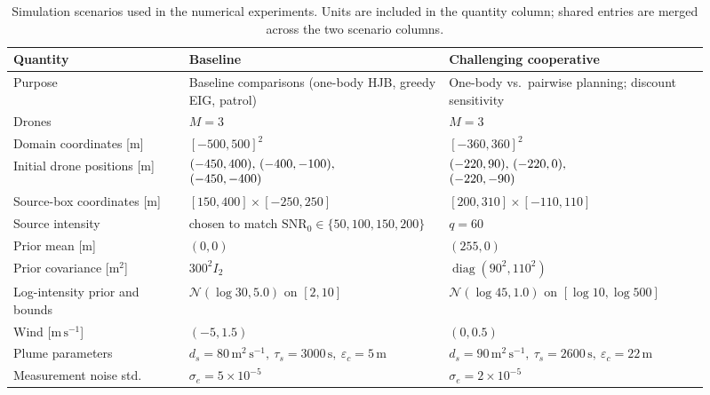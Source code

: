 \documentclass{article}
\DeclareMathOperator{\diag}{diag}
\begin{document}
\begin{table}[p]
  \centering
  \footnotesize
  \setlength{\tabcolsep}{3pt}
  \renewcommand{\arraystretch}{1.14}
  \caption{Simulation scenarios used in the numerical experiments.
  Units are included in the quantity column; shared entries are merged across the two scenario columns.}
  \label{tab:simulation_scenarios}
  \begin{tabular}{@{}>{\raggedright\arraybackslash}p{0.23\linewidth}>{\raggedright\arraybackslash}p{0.34\linewidth}>{\raggedright\arraybackslash}p{0.34\linewidth}@{}}
    \toprule
    Quantity & Baseline & Challenging cooperative \\
    \midrule
    Purpose & Baseline comparisons (one-body HJB, greedy EIG, patrol) & One-body vs.\ pairwise planning; discount sensitivity \\
    Drones & $M=3$ & $M=3$ \\
    Domain coordinates [m] %
 & $[-500,500]^2$ & $[-360,360]^2$ \\
    Initial drone positions [m] & $\begin{array}{@{}l@{}}(-450,400),\,(-400,-100),\\(-450,-400)\end{array}$ & $\begin{array}{@{}l@{}}(-220,90),\,(-220,0),\\(-220,-90)\end{array}$ \\
    Source-box coordinates [m] %
 & $[150,400]\times[-250,250]$ & $[200,310]\times[-110,110]$ \\
    Source intensity & chosen to match $\mathrm{SNR}_0\in\{50,100,150,200\}$ & $q=60$ \\
    Prior mean [m] & $(0,0)$ & $(255,0)$ \\
    Prior covariance [$\mathrm{m}^2$] & $300^2 I_2$ & $\diag(90^2,110^2)$ \\
    Log-intensity prior and bounds & $\mathcal N(\log 30,5.0)$ on $[2,10]$ & $\mathcal N(\log 45,1.0)$ on $[\log 10,\log 500]$ \\
    Wind [$\mathrm{m\,s^{-1}}$] & $(-5,1.5)$ & $(0,0.5)$ \\
    Plume parameters & $d_s=80\,\mathrm{m^2\,s^{-1}},\ \tau_s=3000\,\mathrm{s},\ \varepsilon_c=5\,\mathrm{m}$ & $d_s=90\,\mathrm{m^2\,s^{-1}},\ \tau_s=2600\,\mathrm{s},\ \varepsilon_c=22\,\mathrm{m}$ \\
    Measurement noise std. & $\sigma_e=5\times10^{-5}$ & $\sigma_e=2\times10^{-5}$ \\

\end{tabular}
\end{table}
\end{document}
